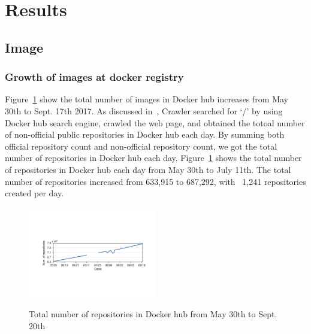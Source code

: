 
\section{Results}


\subsection{Image}

\subsubsection{Growth  of images at docker registry}

Figure~\ref{fig_image_growth} show the total number of images in Docker hub increases from May 30th to Sept. 17th 2017. As discussed in~\cite{XXX}, Crawler searched for `/' by using Docker hub search engine, crawled the web page, and obtained the totoal number of non-official public repositories in Docker hub each day. By summing both official repository count and non-official repository count, we got the total number of repositories in Docker hub each day. Figure~\ref{fig_image_growth} shows the total number of repositories in Docker hub each day from May 30th to July 11th. The total number of repositories increased from 633,915 to 687,292, with ~1,241 repositories created per day.

\begin{figure}
  \centering
  \includegraphics[width=0.5\textwidth]{graphs/image_growth}\\
  \caption{Total number of repositories in Docker hub from May 30th to Sept. 20th}\label{fig_image_growth}
\end{figure}

